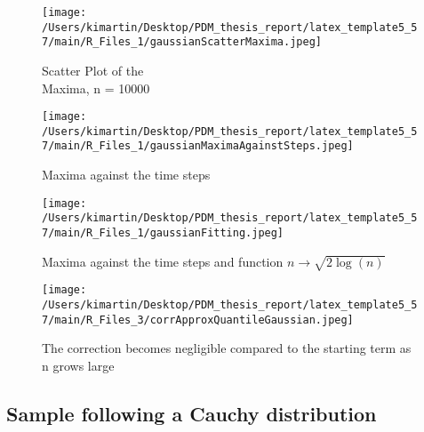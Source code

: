 \begin{figure}[h!]
	\centering
	\begin{minipage}[b]{0.4\textwidth}
        \centering
        \texttt{[image: /Users/kimartin/Desktop/PDM\_thesis\_report/latex\_template5\_57/main/R\_Files\_1/gaussianScatterMaxima.jpeg]}
        \caption{Scatter Plot of the \\Maxima, n = 10000}
        \label{fig:toyingLimitGaussianScatter}
	\end{minipage}
	\begin{minipage}[b]{0.4\textwidth}
		        \centering
		        \texttt{[image: /Users/kimartin/Desktop/PDM\_thesis\_report/latex\_template5\_57/main/R\_Files\_1/gaussianMaximaAgainstSteps.jpeg]}
		        \caption{Maxima against the time steps}
		        \label{fig:toyingLimitGaussianAgainst}
	\end{minipage}
 \end{figure}
 \begin{figure}[h!]
       \centering
       \texttt{[image: /Users/kimartin/Desktop/PDM\_thesis\_report/latex\_template5\_57/main/R\_Files\_1/gaussianFitting.jpeg]}
       \caption{Maxima against the time steps and function $n \rightarrow \sqrt{2 \log(n)}$}
       \label{fig:toyingLimitGaussianFitting}
\end{figure}
 \begin{figure}[h!]
 	\centering
 	\texttt{[image: /Users/kimartin/Desktop/PDM\_thesis\_report/latex\_template5\_57/main/R\_Files\_3/corrApproxQuantileGaussian.jpeg]}
 	\caption{The correction becomes negligible compared to the starting term as n grows large}
 	\label{fig:toyingLimitGaussianCorr}
 \end{figure}
\subsection{Sample following a Cauchy distribution}
